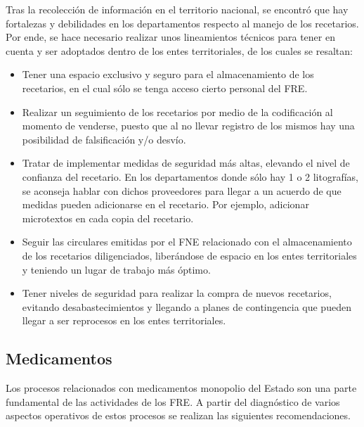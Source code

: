 \documentclass[
  oneside]{book}
\begin{document}
Tras la recolección de información en el territorio nacional, se encontró que hay fortalezas y debilidades en los departamentos respecto al manejo de los recetarios. Por ende, se hace necesario realizar unos lineamientos técnicos para tener en cuenta y ser adoptados dentro de los entes territoriales, de los cuales se resaltan:

\begin{itemize}
\item
  Tener una espacio exclusivo y seguro para el almacenamiento de los recetarios, en el cual sólo se tenga acceso cierto personal del FRE.
\item
  Realizar un seguimiento de los recetarios por medio de la codificación al momento de venderse, puesto que al no llevar registro de los mismos hay una posibilidad de falsificación y/o desvío.
\item
  Tratar de implementar medidas de seguridad más altas, elevando el nivel de confianza del recetario. En los departamentos donde sólo hay 1 o 2 litografías, se aconseja hablar con dichos proveedores para llegar a un acuerdo de que medidas pueden adicionarse en el recetario. Por ejemplo, adicionar microtextos en cada copia del recetario.
\item
  Seguir las circulares emitidas por el FNE relacionado con el almacenamiento de los recetarios diligenciados, liberándose de espacio en los entes territoriales y teniendo un lugar de trabajo más óptimo.
\item
  Tener niveles de seguridad para realizar la compra de nuevos recetarios, evitando desabastecimientos y llegando a planes de contingencia que pueden llegar a ser reprocesos en los entes territoriales.
\end{itemize}

\hypertarget{medicamentos}{%
\subsection{Medicamentos}\label{medicamentos}}

Los procesos relacionados con medicamentos monopolio del Estado son una parte fundamental de las actividades de los FRE. A partir del diagnóstico de varios aspectos operativos de estos procesos se realizan las siguientes recomendaciones.
\end{document}
